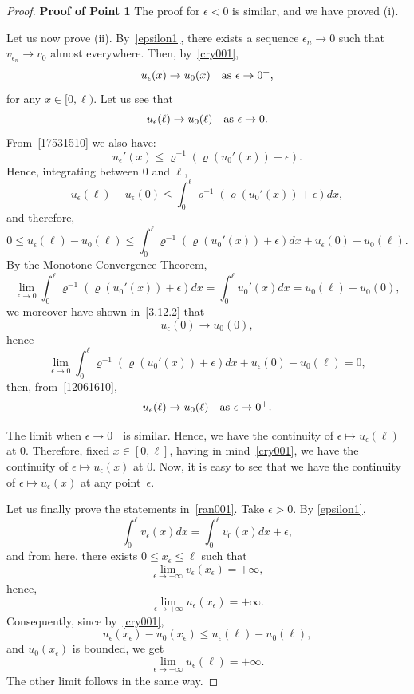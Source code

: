 \documentclass[10pt,a4paper]{amsart}
\begin{document}
\begin{proof}  {\bf Proof of Point 1}
 The proof for $\epsilon<0$ is similar, and we have proved (i). 
 
 Let us now prove  (ii). By~\eqref{epsilon1}, there exists a  sequence $\epsilon_n\to 0$ such that $v_{\epsilon_n}\to v_0$ almost everywhere. Then, by~\eqref{cry001}, 
\begin{equation}\label{3.12.2}u_\epsilon(x)\to u_0(x)\quad\hbox{as }\epsilon\to 0^+,
\end{equation}
for any $x\in[0,\ell)$. 
Let us see that $$u_\epsilon(\ell)\to u_0(\ell)\quad\hbox{as }\epsilon\to 0.$$ 
From~\eqref{17531510} we also have: 
\begin{equation}\label{conv0003}
u_\epsilon'(x)\le \varrho^{-1}(\varrho(u_0'(x))+\epsilon).
\end{equation}
 Hence, integrating between $0$ and $\ell$,
 $$ u_\epsilon(\ell) - u_\epsilon(0)\le \int_0^\ell \varrho^{-1}(\varrho(u_0'(x))+\epsilon)dx,$$
 and therefore,
 \begin{equation}\label{12061610}
0\le u_\epsilon(\ell) - u_0(\ell)\le \int_0^\ell \varrho^{-1}(\varrho(u_0'(x))+\epsilon)dx+u_\epsilon(0)-u_0(\ell).
\end{equation}
By the  Monotone Convergence Theorem, 
 $$\lim_{\epsilon\to 0}\int_0^\ell \varrho^{-1}(\varrho(u_0'(x))+\epsilon)dx=\int_0^\ell u_0'(x)dx=u_0(\ell)-u_0(0),$$
we moreover have shown in~\eqref{3.12.2} that  $$u_\epsilon(0)\to u_0(0),$$   hence
 $$ 
 \displaystyle\lim_{\epsilon\to 0}\int_0^\ell \varrho^{-1}(\varrho(u_0'(x))+\epsilon)dx+u_\epsilon(0)-u_0(\ell)=0,
 $$
 then, from~\eqref{12061610},
 $$u_\epsilon(\ell)\to u_0(\ell)\quad\hbox{as }\epsilon\to 0^+.$$
 
The limit when  $\epsilon\to 0^-$ is similar.   Hence, we have  the continuity of $\epsilon\mapsto u_\epsilon(\ell)$ at $0$. Therefore,  fixed $x\in[0,\ell]$, having in mind~\eqref{cry001},   we have  the continuity of $\epsilon\mapsto u_\epsilon(x)$ at $0$. Now, it is easy to see that we have the continuity of $\epsilon\mapsto u_\epsilon(x)$ at any point~$\epsilon$.  
   

Let us finally prove the  statements in~\eqref{ran001}.   Take $\epsilon>0$.      By \eqref{epsilon1},
$$\int_0^\ell v_\epsilon(x)dx=\int_0^\ell v_0(x)dx+\epsilon,$$ and from here, there exists $0\le x_\epsilon\le\ell$ such that 
$$\lim_{\epsilon\to+\infty}v_\epsilon(x_\epsilon)=+\infty,$$
hence, 
$$\lim_{\epsilon\to+\infty}u_\epsilon(x_\epsilon)=+\infty.$$
Consequently,   since  by~\eqref{cry001},
$$  u_\epsilon(x_\epsilon) - u_0(x_\epsilon)\le u_\epsilon(\ell) - u_0(\ell),$$
and $u_0(x_\epsilon)$ is bounded, we get 
$$\lim_{\epsilon\to+\infty}u_\epsilon(\ell)=+\infty.$$
The other limit  follows in the same way.


\end{proof}
\end{document}
